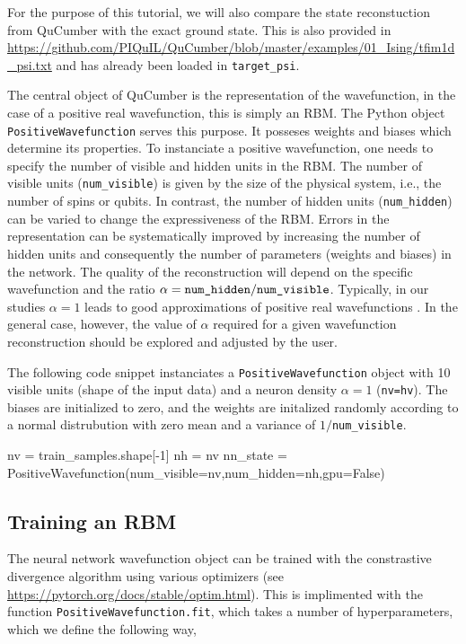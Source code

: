 \documentclass[submission, Phys]{SciPost}
\begin{document}
For the purpose of this tutorial, we will also compare the state reconstuction from QuCumber with the exact ground state.
This is also provided in \url{https://github.com/PIQuIL/QuCumber/blob/master/examples/01_Ising/tfim1d_psi.txt} and has already been loaded in \verb|target_psi|.

The central object of QuCumber is the representation of the wavefunction, in the case of a positive real wavefunction, this is simply an RBM.
The Python object \verb|PositiveWavefunction| serves this purpose.
It posseses weights and biases which determine its properties.
To instanciate a positive wavefunction, one needs to specify the number of visible and hidden units in the RBM.
The number of visible units (\verb|num_visible|) is given by the size of the physical system, i.e., the number of spins or qubits.
In contrast, the number of hidden units (\verb|num_hidden|) can be varied to change the expressiveness of the RBM.
Errors in the representation can be systematically improved by increasing the number of hidden units and consequently
the number of parameters (weights and biases) in the network.
The quality of the reconstruction will depend on the specific wavefunction and the ratio $\alpha = \verb|num_hidden|/\verb|num_visible|$.
Typically, in our studies $\alpha = 1$ leads to good approximations of positive real wavefunctions \cite{Torlai2016thermo}.
In the general case, however, the value of $\alpha$ required for a given wavefunction reconstruction should be explored and adjusted by the user.

The following code snippet instanciates a \verb|PositiveWavefunction| object with 10 visible units (shape of the input data) and a neuron density $\alpha=1$ (\verb|nv=hv|).
The biases are initialized to zero, and the weights are initalized randomly according to a normal distrubution with zero mean and a variance of $1/$\verb|num_visible|.

\begin{python}
nv = train_samples.shape[-1]
nh = nv
nn_state = PositiveWavefunction(num_visible=nv,num_hidden=nh,gpu=False)
\end{python}

\subsection{Training an RBM}

The neural network wavefunction object can be trained with the constrastive divergence algorithm using various optimizers (see \url{https://pytorch.org/docs/stable/optim.html}).
This is implimented with the function \verb|PositiveWavefunction.fit|, which takes a number of hyperparameters, which we define the following way,
\end{document}
